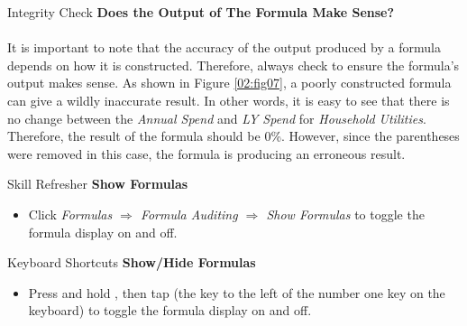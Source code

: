 \begin{center}
	\begin{infobox}{Integrity Check}
		\textbf{Does the Output of The Formula Make Sense?}
		\\
		\\
		It is important to note that the accuracy of the output produced by a formula depends on how it is constructed. Therefore, always check to ensure the formula’s output makes sense. As shown in Figure \ref{02:fig07}, a poorly constructed formula can give a wildly inaccurate result. In other words, it is easy to see that there is no change between the \textit{Annual Spend} and \textit{LY Spend} for \textit{Household Utilities}. Therefore, the result of the formula should be $ 0 $\%. However, since the parentheses were removed in this case, the formula is producing an erroneous result.
	\end{infobox}
\end{center}

\begin{center}
	\begin{sklbox}{Skill Refresher}
		\textbf{Show Formulas}
		\\
		\begin{itemize}
			\setlength{\itemsep}{0pt}
			\setlength{\parskip}{0pt}
			\setlength{\parsep}{0pt}
			
			\item Click \textit{Formulas $ \Rightarrow $ Formula Auditing $ \Rightarrow $ Show Formulas} to toggle the formula display on and off.
			
		\end{itemize}
	\end{sklbox}
\end{center}

\begin{center}
	\begin{shtcutbox}{Keyboard Shortcuts}
		\textbf{Show/Hide Formulas}
		\\
		\begin{itemize}
			\setlength{\itemsep}{0pt}
			\setlength{\parskip}{0pt}
			\setlength{\parsep}{0pt}
			
			\item Press and hold , then tap  (the key to the left of the number one key on the keyboard) to toggle the formula display on and off.
			
		\end{itemize}
	\end{shtcutbox}
\end{center}

